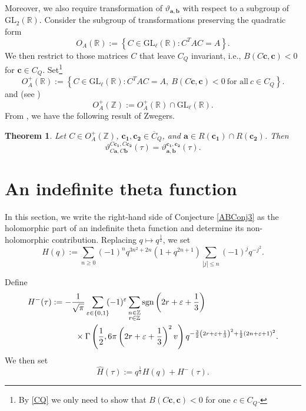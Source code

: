 \documentclass[12pt,reqno]{amsart}
\renewcommand{\r}{{\rho}}
\renewcommand{\t}{\tau}
\renewcommand{\(}{\left\(}
\renewcommand{\)}{\right\)}
\numberwithin{equation}{section}
\theoremstyle{plain}
\newtheorem{theorem}{Theorem}[section]
\theoremstyle{definition}
\numberwithin{equation}{section}
\begin{document}
Moreover, we also require transformation of $\vartheta_{\bm{a},\bm{b}}$ with respect to a subgroup of $\text{GL}_2(\mathbb{R})$. Consider the subgroup of transformations preserving the quadratic form
\[
O_A(\mathbb{R}):=\left\{C\in \text{GL}_{\ell}\left(\mathbb{R}\right): C^T AC=A\right\}.
\]  
We then restrict to those matrices $C$ that leave $C_Q$ invariant, i.e., $B(C\bm{c}, \bm{c})<0$ for $\bm{c}\in C_Q$. Set\footnote{By \eqref{CQ} we only need to show that $B(C\bm{c},\bm{c})<0$ for one $c\in C_Q$.}
\[
O^{+}_A(\mathbb{R}):=\left\{C\in\text{GL}_{\ell}(\mathbb{R}): C^TAC=A,\ B\left(C\bm{c},\bm{c}\right)<0\ \text{for all}\ c\in C_Q \right\}.
\]
and (see \cite[Definition 2.10]{Zw})
\[
O^{+}_A(\mathbb{Z}):=O^{+}_A(\mathbb{R})\cap \text{GL}_{\ell}(\mathbb{R}).
\] 
From \cite[Corollary 2.15]{Zw}, we have the following result of Zwegers.
\begin{theorem}\label{Zwmainthm2}
	Let $C\in O^{+}_A(\mathbb{Z})$, $\bm{c_1}, \bm{c_2}\in \overline{C}_Q$, and $\bm{a}\in R(\bm{c_1})\cap R(\bm{c_2})$. Then
	\[
	\vartheta^{C\bm{c_1}, C\bm{c_2}}_{C\bm{a},C\bm{b}}(\t)=\vartheta^{\bm{c_1}, \bm{c_2}}_{\bm{a},\bm{b}}(\t).
	\]
\end{theorem}

\section{An indefinite theta function}\label{sec2}

In this section, we write the right-hand side of Conjecture \ref{ABConj3} as the holomorphic part of an indefinite theta function and determine its non-holomorphic contribution. Replacing $q\mapsto q^{\frac 12}$, we set 
\begin{equation*}%
H(q):=\sum_{n\ge 0}(-1)^nq^{3n^2+2n}\left(1+q^{2n+1}\right)\sum_{|j|\le n}(-1)^{j}q^{-j^2}.
\end{equation*}


Define %
\begin{align}\nonumber
H^{-}(\t)&:=-\frac{1}{\sqrt{\pi}}\sum_{\varepsilon\in\{0,1\}}\!\!(-1)^{\varepsilon}\sum_{\substack{n\in \mathbb{Z}\\r\in \mathbb{Z}}}\text{sgn}\left(2r+\varepsilon+\frac 13\right)\\\label{hhat1}
&\hspace{1 cm}\times\Gamma\left(\frac 12,6\pi\left(2r+\varepsilon+\frac 13\right)^2v\right)q^{-\frac 32\left(2r+\varepsilon+\frac 13\right)^2+\frac 12\left(2n+\varepsilon+1\right)^2}.
\end{align}
We then set
\begin{equation}\label{hhat2}
\widehat{H}(\t):=q^{\frac 13}H(q)+H^{-}(\t).
\end{equation}
\end{document}

